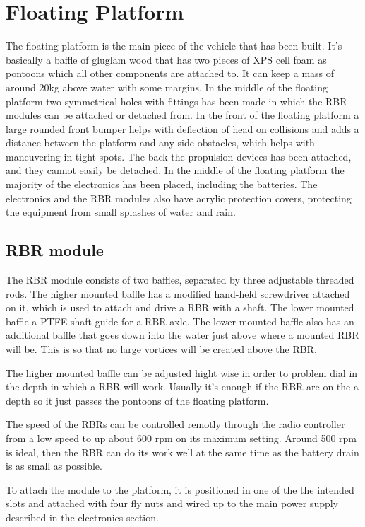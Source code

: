 \section{Floating Platform}
The floating platform is the main piece of the vehicle that has been built. It's basically a baffle of gluglam wood that has two pieces of XPS cell foam as pontoons which all other components are attached to. It can keep a mass of around 20kg above water with some margins. In the middle of the floating platform two symmetrical holes with fittings has been made in which the RBR modules can be attached or detached from. In the front of the floating platform a large rounded front bumper helps with deflection of head on collisions and adds a distance between the platform and any side obstacles, which helps with maneuvering in tight spots. The back the propulsion devices has been attached, and they cannot easily be detached. In the middle of the floating platform the majority of the electronics has been placed, including the batteries. The electronics and the RBR modules also have acrylic protection covers, protecting the equipment from small splashes of water and rain.           

\subsection{RBR module}
The RBR module consists of two baffles, separated by three adjustable threaded rods. The higher mounted baffle has a modified hand-held screwdriver attached on it, which is used to attach and drive a RBR with a shaft. The lower mounted baffle a PTFE shaft guide for a RBR axle. The lower mounted baffle also has an additional baffle that goes down into the water just above where a mounted RBR will be. This is so that no large vortices will be created above the RBR. 

The higher mounted baffle can be adjusted hight wise in order to problem dial in the depth in which a RBR will work. Usually it's enough if the RBR are on the a depth so it just passes the pontoons of the floating platform.

The speed of the RBRs can be controlled remotly through the radio controller from a low speed to up about 600 rpm on its maximum setting. Around 500 rpm is ideal, then the RBR can do its work well at the same time as the battery drain is as small as possible. 

To attach the module to the platform, it is positioned in one of the the intended slots and attached with four fly nuts and wired up to the main power supply described in the electronics section.

